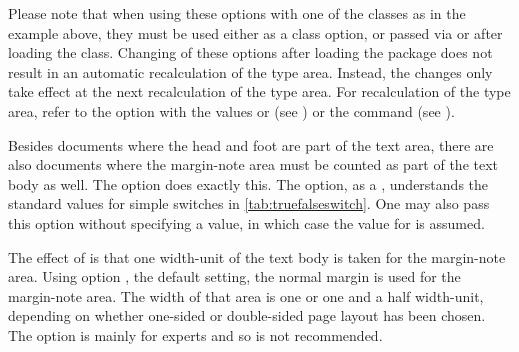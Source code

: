 Please note that when using these options with one of the
{\KOMAScript} classes as in the example above, they must be used
either as a class option, or passed via  or
 after loading the class. Changing of these options
after loading the  package does not result in an
automatic recalculation of the type area. Instead, the changes only
take effect at the next recalculation of the type area. For
recalculation of the type area, refer to the  option with
the values  or  (see
) or the
 command (see
).%
%
%
%


%
\begin{Declaration}
\end{Declaration}
Besides documents where the head and foot are part of the
text area, there are also documents where the margin-note area must be
counted as part of the text body as well.  The option  does
exactly this.  The option, as a
, understands the
standard values for simple switches in
\autoref{tab:truefalseswitch}. One may also pass this option without
specifying a value, in which case the value  for
 is assumed.

The effect of  is that one width-unit of
the text body is taken for the margin-note area.  Using option
, the default setting, the normal
margin is used for the margin-note area.  The width of that area is
one or one and a half width-unit, depending on whether one-sided or
double-sided page layout has been chosen.  The option
 is mainly for experts and so is not recommended.
  
